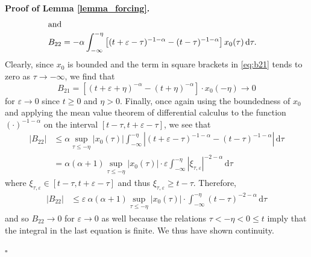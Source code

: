 \documentclass{svproc}
\renewenvironment{proof}[1][Proof]{\par\noindent\textbf{#1.} }{\hfill$\square$\par\vspace{1em}}
\newcommand{\epsC}{\varepsilon}
\begin{document}
\begin{proof}[Proof of Lemma \ref{lemma_forcing}]
\begin{align}
\intertext{and}
	\nonumber
	B_{22} &= -\alpha \int_{-\infty}^{-\eta} \left[ (t+\epsC - \tau)^{-1-\alpha} - (t - \tau)^{-1-\alpha} \right] 
						{x_0}(\tau) \, \mathrm d \tau.
\end{align}
Clearly, since ${x_0}$ is bounded and the term in square brackets in \eqref{eq:b21} tends to zero as $\tau \to -\infty$, we find that
\begin{equation}
	B_{21} = \left[ (t + \epsC  + \eta)^{-\alpha} - (t + \eta)^{-\alpha} \right]
				\cdot {x_0}(- \eta)
		\to 0
\end{equation}
for $\epsC \to 0$ since $t \ge 0$ and $\eta > 0$. Finally, once again using the boundedness of ${x_0}$ and applying the
mean value theorem of differential calculus to the function $(\cdot)^{-1-\alpha}$ on the interval $[t - \tau, t+\epsC - \tau]$, we see that
\begin{align}
	|B_{22}| 
	& \le \alpha \sup_{\tau \le - \eta} |{x_0}(\tau)| 
				 \int_{-\infty}^{-\eta} \left| (t+\epsC - \tau)^{-1-\alpha} - (t - \tau)^{-1-\alpha} \right| 
				 	\, \mathrm d \tau \\
	&= \alpha (\alpha + 1) \sup_{\tau \le - \eta} |{x_0}(\tau)| \cdot \epsC  
				 \int_{-\infty}^{-\eta} \left| \xi_{\tau, \epsC} \right|^{-2-\alpha} 
				 	\, \mathrm d \tau
\end{align}
where $\xi_{\tau, \epsC} \in [t - \tau, t+\epsC - \tau]$ and thus $\xi_{\tau, \epsC} \geq  t - \tau$. Therefore,
\begin{align}
	|B_{22}| & \le \epsC ~ \alpha (\alpha + 1) \sup_{\tau \le - \eta} |{x_0}(\tau)| \cdot 
			 \int_{-\infty}^{-\eta} (t - \tau)^{-2-\alpha} 
				 	\, \mathrm d \tau 
\end{align}
and so $B_{22} \to 0$ for $\epsC \to 0$ as well because the relations $\tau < - \eta < 0 \le t$ imply that
the integral in the last equation is finite. We thus have shown continuity.
    

\end{proof}
\end{document}

